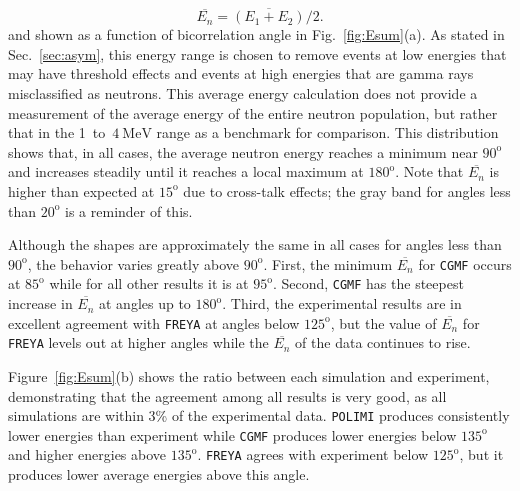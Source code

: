 \documentclass[preprint,12pt]{elsarticle}
\newcommand{\fig}[1]     {Fig.~\ref{#1}}
\newcommand{\figfirst}[1]  {Figure~\ref{#1}}
\newcommand{\secref}[1]  {Sec.~\ref{#1}}
\newcommand{\cgmf}            {\texttt{CGMF}\xspace}
\newcommand{\freya}           {\texttt{FREYA}\xspace}
\newcommand{\polimi}          {\texttt{POLIMI}\xspace}
\newcommand{\Eave}{\ensuremath{\overline{E_n}}\xspace}
\newcommand{\genunit}[2]{\ensuremath{#1~\text{#2}}\xspace}
\newcommand{\MeV}[1]    {\genunit{#1}{MeV}}
\newcommand{\degrees}[1]{\ensuremath{#1^{\mathrm{o}}}\xspace}
\begin{document}
\begin{equation}
\label{eq:Eave}
\Eave = \overline{(E_1+E_2)}/2.
\end{equation}
and shown as a function of bicorrelation angle in \fig{fig:Esum}(a). As stated in \secref{sec:asym}, this energy range is chosen to remove events at low energies that may have threshold effects and events at high energies that are gamma rays misclassified as neutrons. This average energy calculation does not provide a measurement of the average energy of the entire neutron population, but rather that in the 1~to~\MeV{4} range as a benchmark for comparison. This distribution shows that, in all cases, the average neutron energy reaches a minimum near \degrees{90} and increases steadily until it reaches a local maximum at \degrees{180}. Note that \Eave is higher than expected at \degrees{15} due to cross-talk effects; the gray band for angles less than \degrees{20} is a reminder of this. 

Although the shapes are approximately the same in all cases for angles less than \degrees{90}, the behavior varies greatly above \degrees{90}. First, the minimum \Eave for \cgmf occurs at \degrees{85} while for all other results it is at \degrees{95}. Second, \cgmf has the steepest increase in \Eave at angles up to \degrees{180}. Third, the experimental results are in excellent agreement with \freya at angles below \degrees{125}, but the value of \Eave for \freya levels out at higher angles while the \Eave of the data continues to rise. 

\figfirst{fig:Esum}(b) shows the ratio between each simulation and experiment, demonstrating that the agreement among all results is very good, as all simulations are within 3\% of the experimental data. \polimi produces consistently lower energies than experiment while \cgmf produces lower energies below \degrees{135} and higher energies above \degrees{135}. \freya agrees with experiment below \degrees{125}, but it produces lower average energies above this angle.
\end{document}
